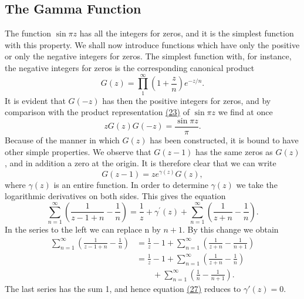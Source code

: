 \setcounter{section}{2}\setcounter{subsection}{3}\subsection{The Gamma Function}\label{sec:5.2.4}
The function $\sin \pi z$ has all the integers for zeros, and it is the simplest function with this property. We shall now introduce functions which have only the positive or only the negative integers for zeros. The simplest function with, for instance, the negative integers for zeros is the corresponding canonical product
\begin{equation*}
G (z) = \prod_ {1} ^ {\infty} \left(1 + \frac {z}{n}\right) e ^ {- z / n}.\tag{25}\label{eq:5.25}
\end{equation*}
It is evident that $G(-z)$ has then the positive integers for zeros, and by comparison with the product representation \hyperref[eq:5.23]{(23)} of $\sin \pi z$ we find at once
\begin{equation*}
z G (z) G (- z) = \frac {\sin \pi z}{\pi}.\tag{26}\label{eq:5.26}
\end{equation*}
Because of the manner in which $G(z)$ has been constructed, it is bound to have other simple properties. We observe that $G(z - 1)$ has the same zeros as $G(z)$, and in addition a zero at the origin. It is therefore clear that we can write
\begin{equation*}
G (z - 1) = z e ^ {\gamma (z)} G (z),
\end{equation*}
where $\gamma(z)$ is an entire function. In order to determine $\gamma(z)$ we take the logarithmic derivatives on both sides. This gives the equation
\begin{equation*}
\sum_ {n = 1} ^ {\infty} \left(\frac {1}{z - 1 + n} - \frac {1}{n}\right) = \frac {1}{z} + \gamma^ {\prime} (z) + \sum_ {n = 1} ^ {\infty} \left(\frac {1}{z + n} - \frac {1}{n}\right).\tag{27}\label{eq:5.27}
\end{equation*}
In the series to the left we can replace n by $n + 1$. By this change we obtain
\begin{equation*}
\begin{aligned}
\sum_{n=1}^\infty\left(\frac1{z-1+n}-\frac1n\right)
&=\frac1z-1+\sum_{n=1}^\infty\left(\frac1{z+n}-\frac1{n+1}\right)\\
&=\frac1z-1+\sum_{n=1}^\infty\left(\frac1{z+n}-\frac1n\right)\\
&\qquad+\sum_{n=1}^\infty\left(\frac1n-\frac1{n+1}\right).
\end{aligned}
\end{equation*}
The last series has the sum 1, and hence equation \hyperref[eq:5.27]{(27)} reduces to $\gamma'(z) = 0$.


